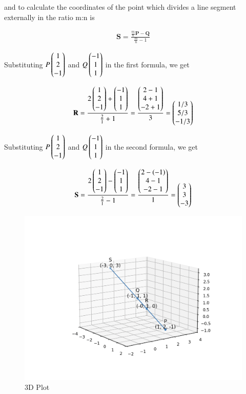 \documentclass[12pt]{article}
\begin{document}
and to calculate the coordinates of the point which divides a line segment externally in the ratio m:n is 

\begin{align}
    \mathbf{S}=\frac{\frac{m}{n}\mathbf{P}-\mathbf{Q}}{\frac{m}{n}-1}
\end{align}

Substituting $P\myvec{ 1 \\ 2\\ -1}$ and $Q\myvec{ -1 \\ 1\\ 1}$ in the first formula, we get \vspace{0.5cm}

\begin{align}
    \mathbf{R}=\frac{2\myvec{ 1 \\ 2\\ -1}+\myvec{ -1 \\ 1\\ 1}}{\frac{2}{1}+1} = \frac{\myvec{ 2-1 \\ 4+1\\ -2+1}}{3} = \myvec{ 1/3\\ 5/3\\ -1/3}
\end{align}

\vspace{1cm}

Substituting $P\myvec{ 1 \\ 2\\ -1}$ and $Q\myvec{ -1 \\ 1\\ 1}$ in the second formula, we get  \vspace{0.5cm}

\begin{align}
    \mathbf{S}=\frac{2\myvec{ 1 \\ 2\\ -1}-\myvec{ -1 \\ 1\\ 1}}{\frac{2}{1}-1} = \frac{\myvec{ 2-(-1) \\ 4-1\\ -2-1}}{1} = \myvec{ 3\\ 3\\ -3}
\end{align}

\begin{figure}[H]
    \centering
    \includegraphics[width=1.1\columnwidth]{Figs/Figure_1.png}
    \caption{3D Plot}
    \label{fig:placeholder}
\end{figure}
\end{document}
